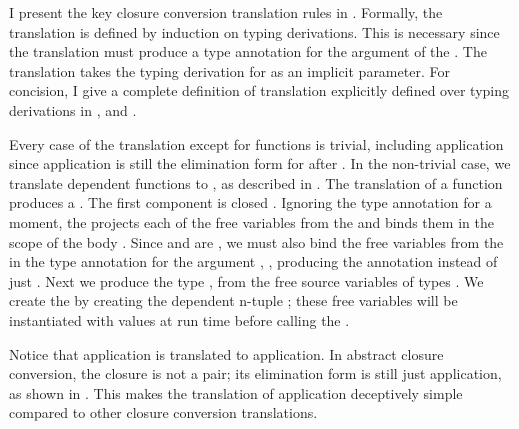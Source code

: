 {
    \allowdisplaybreaks
I present the key closure conversion translation rules in
.
Formally, the translation is defined by induction on typing derivations.
This is necessary since the translation must produce a type annotation for the
 argument of the .
The translation \im{\cctrans{\se}} takes the typing derivation for \im{\se} as
an implicit parameter.
For concision, I give a complete definition of translation
explicitly defined over typing derivations in ,
 and .

Every case of the translation except for functions is trivial, including
application since application is still the elimination form for 
after .
In the non-trivial case, we translate \slang dependent functions to \tlang
{}, as described in .
The translation of a function \im{\cctrans{\sfune{\sx}{\sA}{\se}}} produces a
 \im{\tcloe{\teone}{\tetwo}}.
The first component \im{\teone} is closed .
Ignoring the type annotation for a moment, the 
\im{\tnfune{(\tn,\tx)}{\tlete{\tnpaire{\txi\dots}}{\tn}{\cctrans{\se}}}} projects each
of the  free variables \im{\txi\dots} from the  \im{\tn}
and binds them in the scope of the body \im{\cctrans{\se}}.
Since \slang and \tlang are , we must also bind the free
variables from the  in the type annotation for the argument
\im{\tx}, \ie, producing the annotation
\im{\tx:\tlete{\tnpaire{\txi\dots}}{\tn}{\cctrans{\sA}}} instead of just \im{\tx:\cctrans{\sA}}.
Next we produce the  type \im{\tnsigmaty{(\txi:\cctrans{\sA}\dots)}},
from the free source variables \im{\sxi\dots} of types \im{\sAi\dots}.
We create the  \im{\tetwo} by creating the dependent n-tuple
\im{\tnpaire{\txi\dots}}; these free variables will be instantiated with values
at run time before calling the .

Notice that application is translated to application.
In abstract closure conversion, the closure is not a pair; its elimination form
is still just application, as shown in .
This makes the translation of application deceptively simple compared to other
closure conversion translations.

}
